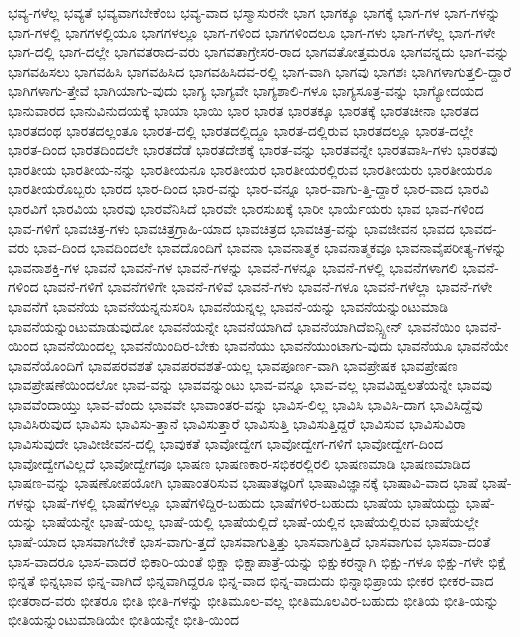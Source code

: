 {ಭವ್ಯ-ಗಳೆಲ್ಲ
ಭವ್ಯತೆ
ಭವ್ಯವಾಗಬೇಕೆಂಬ
ಭವ್ಯ-ವಾದ
ಭಸ್ಮಾಸುರನೇ
ಭಾಗ
ಭಾಗಕ್ಕೂ
ಭಾಗಕ್ಕೆ
ಭಾಗ-ಗಳ
ಭಾಗ-ಗಳನ್ನು
ಭಾಗ-ಗಳಲ್ಲಿ
ಭಾಗಗಳಲ್ಲಿಯೂ
ಭಾಗಗಳಲ್ಲೂ
ಭಾಗ-ಗಳಿಂದ
ಭಾಗಗಳಿಂದಲೂ
ಭಾಗ-ಗಳು
ಭಾಗ-ಗಳೆಲ್ಲ
ಭಾಗ-ಗಳೇ
ಭಾಗ-ದಲ್ಲಿ
ಭಾಗ-ದಲ್ಲೇ
ಭಾಗವತರಾದ-ವರು
ಭಾಗವತಾಗ್ರೇಸರ-ರಾದ
ಭಾಗವತೋತ್ತಮರೂ
ಭಾಗವನ್ನದು
ಭಾಗ-ವನ್ನು
ಭಾಗವಹಿಸಲು
ಭಾಗವಹಿಸಿ
ಭಾಗವಹಿಸಿದ
ಭಾಗವಹಿಸಿದವ-ರಲ್ಲಿ
ಭಾಗ-ವಾಗಿ
ಭಾಗವು
ಭಾಗಶಃ
ಭಾಗಿಗಳಾಗುತ್ತಲಿ-ದ್ದಾರೆ
ಭಾಗಿಗಳಾಗು-ತ್ತೇವೆ
ಭಾಗಿಯಾಗು-ವುದು
ಭಾಗ್ಯ
ಭಾಗ್ಯವೇ
ಭಾಗ್ಯಶಾಲಿ-ಗಳೂ
ಭಾಗ್ಯಸೂತ್ರ-ವನ್ನು
ಭಾಗ್ಯೋದಯದ
ಭಾನುವಾರದ
ಭಾನುವಿನುದಯಕ್ಕೆ
ಭಾಯಾ
ಭಾಯಿ
ಭಾರ
ಭಾರತ
ಭಾರತಕ್ಕೂ
ಭಾರತಕ್ಕೆ
ಭಾರತಚೀನಾ
ಭಾರತದ
ಭಾರತದಂಥ
ಭಾರತದಲ್ಲಂತೂ
ಭಾರತ-ದಲ್ಲಿ
ಭಾರತದಲ್ಲಿದ್ದೂ
ಭಾರತ-ದಲ್ಲಿರುವ
ಭಾರತದಲ್ಲೂ
ಭಾರತ-ದಲ್ಲೇ
ಭಾರತ-ದಿಂದ
ಭಾರತದಿಂದಲೇ
ಭಾರತದೆಡೆ
ಭಾರತದೇಶಕ್ಕೆ
ಭಾರತ-ವನ್ನು
ಭಾರತವನ್ನೇ
ಭಾರತವಾಸಿ-ಗಳು
ಭಾರತವು
ಭಾರತೀಯ
ಭಾರತೀಯ-ನನ್ನು
ಭಾರತೀಯನೂ
ಭಾರತೀಯರ
ಭಾರತೀಯರಲ್ಲಿರುವ
ಭಾರತೀಯರು
ಭಾರತೀಯರೂ
ಭಾರತೀಯರೊಬ್ಬರು
ಭಾರದ
ಭಾರ-ದಿಂದ
ಭಾರ-ವನ್ನು
ಭಾರ-ವನ್ನೂ
ಭಾರ-ವಾಗು-ತ್ತಿ-ದ್ದಾರೆ
ಭಾರ-ವಾದ
ಭಾರವಿ
ಭಾರವಿಗೆ
ಭಾರವಿಯ
ಭಾರವು
ಭಾರವೆನಿಸಿದೆ
ಭಾರವೇ
ಭಾರಸುಖಕ್ಕೆ
ಭಾರೀ
ಭಾರ್ಯೆಯರು
ಭಾವ
ಭಾವ-ಗಳಿಂದ
ಭಾವ-ಗಳಿಗೆ
ಭಾವಚಿತ್ರ-ಗಳು
ಭಾವಚಿತ್ರಗ್ರಾಹಿ-ಯಾದ
ಭಾವಚಿತ್ರದ
ಭಾವಚಿತ್ರ-ವನ್ನು
ಭಾವಜೀವನ
ಭಾವದ
ಭಾವದ-ವರು
ಭಾವ-ದಿಂದ
ಭಾವದಿಂದಲೇ
ಭಾವದೊಂದಿಗೆ
ಭಾವನಾ
ಭಾವನಾತ್ಮಕ
ಭಾವನಾತ್ಮಕವೂ
ಭಾವನಾವೈಪರೀತ್ಯ-ಗಳನ್ನು
ಭಾವನಾಶಕ್ತಿ-ಗಳ
ಭಾವನೆ
ಭಾವನೆ-ಗಳ
ಭಾವನೆ-ಗಳನ್ನು
ಭಾವನೆ-ಗಳನ್ನೂ
ಭಾವನೆ-ಗಳಲ್ಲಿ
ಭಾವನೆಗಳಾಗಲಿ
ಭಾವನೆ-ಗಳಿಂದ
ಭಾವನೆ-ಗಳಿಗೆ
ಭಾವನೆಗಳಿಗೇ
ಭಾವನೆ-ಗಳಿವೆ
ಭಾವನೆ-ಗಳು
ಭಾವನೆ-ಗಳೂ
ಭಾವನೆ-ಗಳೆಲ್ಲಾ
ಭಾವನೆ-ಗಳೇ
ಭಾವನೆಗೆ
ಭಾವನೆಯ
ಭಾವನೆಯನ್ನನುಸರಿಸಿ
ಭಾವನೆಯನ್ನಲ್ಲ
ಭಾವನೆ-ಯನ್ನು
ಭಾವನೆಯನ್ನುಂಟುಮಾಡಿ
ಭಾವನೆಯನ್ನುಂಟುಮಾಡುವುದೋ
ಭಾವನೆಯನ್ನೇ
ಭಾವನೆಯಾಗಿದೆ
ಭಾವನೆಯಾಗಿದೆಐನ್ಸ್ಟೀನ್
ಭಾವನೆಯಿಂ
ಭಾವನೆ-ಯಿಂದ
ಭಾವನೆಯಿಂದಲ್ಲ
ಭಾವನೆಯಿಂದಿರ-ಬೇಕು
ಭಾವನೆಯು
ಭಾವನೆಯುಂಟಾಗು-ವುದು
ಭಾವನೆಯೂ
ಭಾವನೆಯೇ
ಭಾವನೆಯೊಂದಿಗೆ
ಭಾವಪರವಶತೆ
ಭಾವಪರವಶತೆ-ಯಲ್ಲ
ಭಾವಪೂರ್ಣ-ವಾಗಿ
ಭಾವಪ್ರೇಷಕ
ಭಾವಪ್ರೇಷಣ
ಭಾವಪ್ರೇಷಣೆಯಿಂದಲೋ
ಭಾವ-ವನ್ನು
ಭಾವವನ್ನುಂಟು
ಭಾವ-ವನ್ನೂ
ಭಾವ-ವಲ್ಲ
ಭಾವವಿಹ್ವಲತೆಯನ್ನೇ
ಭಾವವು
ಭಾವವೆಂದಾಯ್ತು
ಭಾವ-ವೆಂದು
ಭಾವವೇ
ಭಾವಾಂತರ-ವನ್ನು
ಭಾವಿಸ-ಲಿಲ್ಲ
ಭಾವಿಸಿ
ಭಾವಿಸಿ-ದಾಗ
ಭಾವಿಸಿದ್ದೆವು
ಭಾವಿಸಿರುವುದ
ಭಾವಿಸು
ಭಾವಿಸು-ತ್ತಾನೆ
ಭಾವಿಸುತ್ತಾರೆ
ಭಾವಿಸುತ್ತಿ
ಭಾವಿಸುತ್ತಿದ್ದರೆ
ಭಾವಿಸುವ
ಭಾವಿಸುವಿರಾ
ಭಾವಿಸುವುದೇ
ಭಾವೀಜೀವನ-ದಲ್ಲಿ
ಭಾವುಕತೆ
ಭಾವೋದ್ವೇಗ
ಭಾವೋದ್ವೇಗ-ಗಳಿಗೆ
ಭಾವೋದ್ವೇಗ-ದಿಂದ
ಭಾವೋದ್ವೇಗವಿಲ್ಲದೆ
ಭಾವೋದ್ವೇಗವೂ
ಭಾಷಣ
ಭಾಷಣಕಾರ-ಸಭಿಕರಲ್ಲಿರಲಿ
ಭಾಷಣಮಾಡಿ
ಭಾಷಣಮಾಡಿದ
ಭಾಷಣ-ವನ್ನು
ಭಾಷಣೋಪಯೋಗಿ
ಭಾಷಾಂತರಿಸುವ
ಭಾಷಾತಜ್ಞರಿಗೆ
ಭಾಷಾವಿಜ್ಞಾನಕ್ಕೆ
ಭಾಷಾವಿ-ವಾದ
ಭಾಷೆ
ಭಾಷೆ-ಗಳನ್ನು
ಭಾಷೆ-ಗಳಲ್ಲಿ
ಭಾಷೆಗಳಲ್ಲೂ
ಭಾಷೆಗಳಿದ್ದಿರ-ಬಹುದು
ಭಾಷೆಗಳಿರ-ಬಹುದು
ಭಾಷೆಯ
ಭಾಷೆಯದ್ದು
ಭಾಷೆ-ಯನ್ನು
ಭಾಷೆಯನ್ನೇ
ಭಾಷೆ-ಯಲ್ಲ
ಭಾಷೆ-ಯಲ್ಲಿ
ಭಾಷೆಯಲ್ಲಿದೆ
ಭಾಷೆ-ಯಲ್ಲಿನ
ಭಾಷೆಯಲ್ಲಿರುವ
ಭಾಷೆಯಲ್ಲೇ
ಭಾಷೆ-ಯಾದ
ಭಾಸವಾಗಬೇಕೆ
ಭಾಸ-ವಾಗು-ತ್ತದೆ
ಭಾಸವಾಗುತ್ತಿತ್ತು
ಭಾಸವಾಗುತ್ತಿದೆ
ಭಾಸವಾಗುವ
ಭಾಸವಾ-ದಂತೆ
ಭಾಸ-ವಾದರೂ
ಭಾಸ-ವಾದರೆ
ಭಿಕಾರಿ-ಯಂತೆ
ಭಿಕ್ಷಾ
ಭಿಕ್ಷಾಪಾತ್ರೆ-ಯನ್ನು
ಭಿಕ್ಷುಕರನ್ನಾಗಿ
ಭಿಕ್ಷು-ಗಳೂ
ಭಿಕ್ಷು-ಗಳೇ
ಭಿಕ್ಷೆ
ಭಿನ್ನತೆ
ಭಿನ್ನಭಾವ
ಭಿನ್ನ-ವಾಗಿದೆ
ಭಿನ್ನವಾಗಿದ್ದರೂ
ಭಿನ್ನ-ವಾದ
ಭಿನ್ನ-ವಾದುದು
ಭಿನ್ನಾಭಿಪ್ರಾಯ
ಭೀಕರ
ಭೀಕರ-ವಾದ
ಭೀತರಾದ-ವರು
ಭೀತರೂ
ಭೀತಿ
ಭೀತಿ-ಗಳನ್ನು
ಭೀತಿಮೂಲ-ವಲ್ಲ
ಭೀತಿಮೂಲವಿರ-ಬಹುದು
ಭೀತಿಯ
ಭೀತಿ-ಯನ್ನು
ಭೀತಿಯನ್ನುಂಟುಮಾಡಿಯೇ
ಭೀತಿಯನ್ನೇ
ಭೀತಿ-ಯಿಂದ
}
